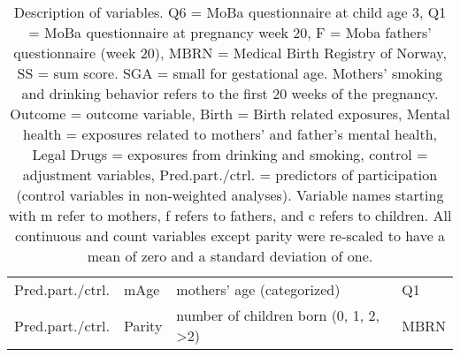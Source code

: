 \begin{table}[ph!]
\begin{tabular}{llll}
  Pred.part./ctrl. & mAge & mothers' age (categorized) & Q1 \\ 
  Pred.part./ctrl. & Parity & number of children born (0, 1, 2, >2) & MBRN \\ 
   \hline
\end{tabular}
\caption{Description of variables.
	\newline Q6 = MoBa questionnaire at child age 3, Q1 =  MoBa questionnaire at pregnancy week 20, F = Moba fathers' questionnaire (week 20), MBRN = Medical Birth Registry of Norway, SS = sum score. SGA = small for gestational age. Mothers' smoking and drinking behavior refers to the first 20 weeks of the pregnancy. 
	\newline Outcome = outcome variable, Birth = Birth related exposures, Mental health = exposures related to mothers' and father's mental health, Legal Drugs = exposures from drinking and smoking, control = adjustment variables, Pred.part./ctrl. = predictors of participation (control variables in non-weighted analyses).
	Variable names starting with m refer to mothers, f refers to fathers, and c refers to children. All continuous and count variables except parity were re-scaled to have a mean of zero and a standard deviation of one.} 
\label{table:variables}
\end{table}
